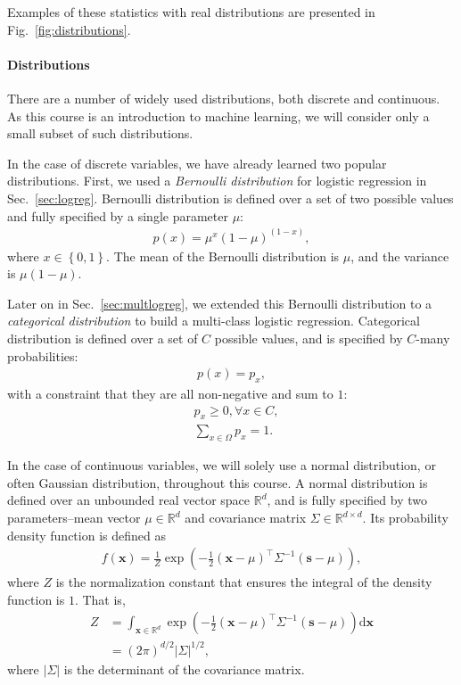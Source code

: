 \documentclass{report}
\newcommand{\vect}[1]{\mathbf{#1}}
\newcommand{\vx}[0]{\vect{x}}
\newcommand{\vs}[0]{\vect{s}}
\newcommand{\RR}[0]{\mathbb{R}}
\newcommand{\dd}[1]{\ensuremath{\mbox{d}#1}}
\begin{document}
Examples of these statistics with real distributions are presented in
Fig.~\ref{fig:distributions}. 


\paragraph{Distributions}

There are a number of widely used distributions, both discrete and continuous.
As this course is an introduction to machine learning, we will consider only a
small subset of such distributions. 

In the case of discrete variables, we have already learned two popular
distributions. First, we used a {\it Bernoulli distribution} for logistic
regression in Sec.~\ref{sec:logreg}. Bernoulli distribution is defined over a
set of two possible values and fully specified by a single parameter $\mu$:
\begin{align*}
    p(x) = \mu^x (1-\mu)^(1-x),
\end{align*}
where $x \in \left\{ 0, 1\right\}$. The mean of the Bernoulli distribution is
$\mu$, and the variance is $\mu (1-\mu)$. 

Later on in Sec.~\ref{sec:multlogreg}, we extended this Bernoulli distribution
to a {\it categorical distribution} to build a multi-class logistic regression.
Categorical distribution is defined over a set of $C$ possible values, and is
specified by $C$-many probabilities:
\begin{align*}
    p(x) = p_x,
\end{align*}
with a constraint that they are all non-negative and sum to $1$:
\begin{align*}
    &p_x \geq 0, \forall x \in C, \\
    &\sum_{x \in \Omega} p_x = 1.
\end{align*}

In the case of continuous variables, we will solely use a normal distribution,
or often Gaussian distribution, throughout this course. A normal distribution is
defined over an unbounded real vector space $\RR^d$, and is fully specified by
two parameters--mean vector $\mu \in \RR^d$ and covariance matrix $\Sigma \in
\RR^{d\times d}$. Its probability density function is defined as
\begin{align}
    \label{eq:gauss_pdf}
    f(\vx) = \frac{1}{Z} \exp\left( 
        -\frac{1}{2} (\vx - \mu)^\top \Sigma^{-1} (\vs - \mu)
    \right),
\end{align}
where $Z$ is the normalization constant that ensures the integral of the density
function is $1$. That is,
\begin{align*}
    Z &= \int_{\vx \in \RR^d} \exp\left( 
        -\frac{1}{2} (\vx - \mu)^\top \Sigma^{-1} (\vs - \mu)
    \right) \dd \vx \\
    &= (2\pi)^{d/2} |\Sigma|^{1/2},
\end{align*}
where $|\Sigma|$ is the determinant of the covariance matrix.
\end{document}
